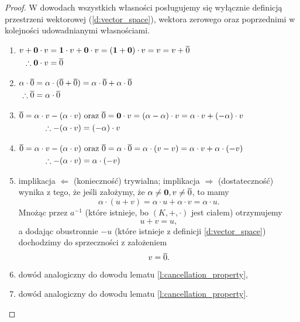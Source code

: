 \begin{proof}
    W dowodach wszystkich własności posługujemy się wyłącznie definicją przestrzeni wektorowej (\ref{d:vector_space}), wektora zerowego oraz poprzednimi w kolejności udowadnianymi własnościami.
    \begin{enumerate}
        \item $\begin{aligned}[t]
            v + \mathbf{0} \cdot v &= \mathbf{1} \cdot v + \mathbf{0} \cdot v = (\mathbf{1} + \mathbf{0}) \cdot v = v = v + \overline{0} \\
            \therefore \mathbf{0} \cdot v &= \overline{0}
            \end{aligned}$
        \item $\begin{aligned}[t]
            \alpha \cdot \overline{0} &= \alpha \cdot (\overline{0} + \overline{0}) = \alpha \cdot \overline{0} + \alpha \cdot \overline{0} \\
            \therefore \overline{0} &= \alpha \cdot \overline{0}
            \end{aligned}$
        \item $\begin{aligned}[t]
            \overline{0} = \alpha \cdot v - (\alpha \cdot v) &\text{ oraz } \overline{0} = \mathbf{0} \cdot v = (\alpha - \alpha) \cdot v = \alpha \cdot v + (-\alpha) \cdot v \\
            \therefore -(\alpha \cdot v) &= (-\alpha) \cdot v
            \end{aligned}$
        \item $\begin{aligned}[t]
            \overline{0} = \alpha \cdot v - (\alpha \cdot v) &\text{ oraz } \overline{0} = \alpha \cdot \overline{0} = \alpha \cdot (v - v) = \alpha \cdot v + \alpha \cdot (-v) \\
            \therefore -(\alpha \cdot v) &= \alpha \cdot (-v)
            \end{aligned}$
        \item implikacja $\Leftarrow$ (konieczność) trywialna; implikacja $\Rightarrow$ (dostateczność) wynika z tego, że jeśli założymy, że $\alpha \neq \mathbf{0}, v \neq \overline{0}$, to mamy
            \[ \alpha \cdot (u + v) = \alpha \cdot u + \alpha \cdot v = \alpha \cdot u. \]
            Mnożąc przez $a^{-1}$ (które istnieje, bo $(K, +, \cdot)$ jest ciałem) otrzymujemy
            \[ u + v = u, \]
            a dodając obustronnie $-u$ (które istnieje z definicji \ref{d:vector_space}) dochodzimy do sprzeczności z założeniem
            \[ v = \overline{0}. \]
        \item dowód analogiczny do dowodu lematu \ref{l:cancellation_property},
        \item dowód analogiczny do dowodu lematu \ref{l:cancellation_property}.
    \end{enumerate}
\end{proof}

